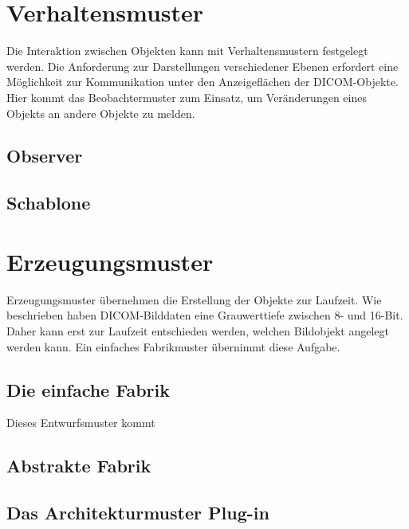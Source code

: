 \section{Verhaltensmuster}
Die Interaktion zwischen Objekten kann mit Verhaltensmustern festgelegt werden. Die Anforderung zur Darstellungen verschiedener Ebenen erfordert eine Möglichkeit zur Kommunikation unter den Anzeigeflächen der DICOM-Objekte. Hier kommt das Beobachtermuster zum Einsatz, um Veränderungen eines Objekts an andere Objekte zu melden.

\subsection{Observer}

\subsection{Schablone}

\section{Erzeugungsmuster}
Erzeugungsmuster übernehmen die Erstellung der Objekte zur Laufzeit. Wie beschrieben haben DICOM-Bilddaten eine Grauwerttiefe zwischen 8- und 16-Bit. Daher kann erst zur Laufzeit entschieden werden, welchen Bildobjekt angelegt werden kann. Ein einfaches Fabrikmuster übernimmt diese Aufgabe.

\subsection{Die einfache Fabrik}
Dieses Entwurfsmuster kommt

\subsection{Abstrakte Fabrik}

\subsection{Das Architekturmuster Plug-in}
